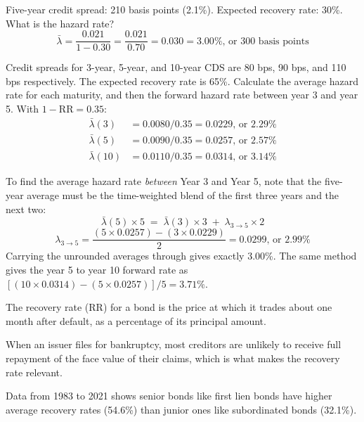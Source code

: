 \begin{crexbox}
Five-year credit spread: 210 basis points (2.1\%). Expected recovery rate: 30\%.
What is the hazard rate?
\tcblower
\[ \bar{\lambda} = \frac{0.021}{1 - 0.30} = \frac{0.021}{0.70} = 0.030 = 3.00\%
   \text{, or 300 basis points} \]
\end{crexbox}

\begin{crexbox}
Credit spreads for 3-year, 5-year, and 10-year CDS are 80 bps, 90 bps, and 110
bps respectively. The expected recovery rate is 65\%. Calculate the average
hazard rate for each maturity, and then the forward hazard rate between year 3
and year 5.
\tcblower
With $1-\mathrm{RR} = 0.35$:
\begin{align*}
\bar{\lambda}(3) &= 0.0080 / 0.35 = 0.0229 \text{, or } 2.29\% \\
\bar{\lambda}(5) &= 0.0090 / 0.35 = 0.0257 \text{, or } 2.57\% \\
\bar{\lambda}(10) &= 0.0110 / 0.35 = 0.0314 \text{, or } 3.14\%
\end{align*}

To find the average hazard rate \emph{between} Year 3 and Year 5, note that the
five-year average must be the time-weighted blend of the first three years and
the next two:
\[ \bar{\lambda}(5)\times 5 \;=\; \bar{\lambda}(3)\times 3
   \;+\; \lambda_{3\to5}\times 2 \]
\[ \lambda_{3\to5} = \frac{(5\times 0.0257) - (3\times 0.0229)}{2} = 0.0299
   \text{, or } 2.99\% \]
Carrying the unrounded averages through gives exactly 3.00\%. The same method
gives the year 5 to year 10 forward rate as
$[(10\times0.0314)-(5\times0.0257)]/5 = 3.71\%$.
\end{crexbox}


\begin{crdefbox}
The recovery rate (RR) for a bond is the price at which it trades about one month
after default, as a percentage of its principal amount.
\end{crdefbox}

When an issuer files for bankruptcy, most creditors are unlikely to receive full
repayment of the face value of their claims, which is what makes the recovery
rate relevant.

Data from 1983 to 2021 shows senior bonds like first lien bonds have higher
average recovery rates (54.6\%) than junior ones like subordinated bonds
(32.1\%).

